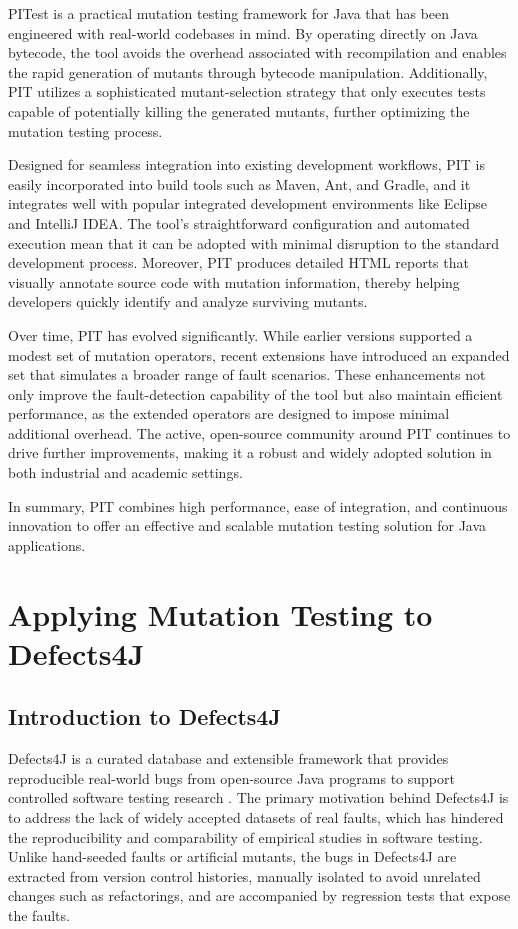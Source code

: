 \documentclass[12pt,a4paper]{article}
\begin{document}
PITest is a practical mutation testing framework for Java that has been
engineered with real-world codebases in mind. By operating directly on Java
bytecode, the tool avoids the overhead associated with recompilation and
enables the rapid generation of mutants through bytecode manipulation.
Additionally, PIT utilizes a sophisticated mutant-selection strategy that
only executes tests capable of potentially killing the generated mutants,
further optimizing the mutation testing process.

Designed for seamless integration into existing development workflows, PIT is
easily incorporated into build tools such as Maven, Ant, and Gradle, and it
integrates well with popular integrated development environments like Eclipse 
and IntelliJ IDEA. The tool’s straightforward configuration and automated 
execution mean that it can be adopted with minimal disruption to the standard
development process. Moreover, PIT produces detailed HTML reports that
visually annotate source code with mutation information, thereby helping
developers quickly identify and analyze surviving mutants.

Over time, PIT has evolved significantly. While earlier versions supported a
modest set of mutation operators, recent extensions have introduced an
expanded set that simulates a broader range of fault scenarios. These
enhancements not only improve the fault-detection capability of the tool but
also maintain efficient performance, as the extended operators are designed
to impose minimal additional overhead. The active, open-source community
around PIT continues to drive further improvements, making it a robust and
widely adopted solution in both industrial and academic settings.

In summary, PIT combines high performance, ease of integration, and continuous
innovation to offer an effective and scalable mutation testing solution for
Java applications.

\section{Applying Mutation Testing to Defects4J}

\subsection{Introduction to Defects4J}

Defects4J is a curated database and extensible framework that provides 
reproducible real-world bugs from open-source Java programs to support 
controlled software testing research \cite{just_defects4j_2014}. The primary 
motivation behind Defects4J is to address the lack of widely accepted datasets 
of real faults, which has hindered the reproducibility and comparability of 
empirical studies in software testing. Unlike hand-seeded faults or artificial 
mutants, the bugs in Defects4J are extracted from version control histories, 
manually isolated to avoid unrelated changes such as refactorings, and are 
accompanied by regression tests that expose the faults.
\end{document}
